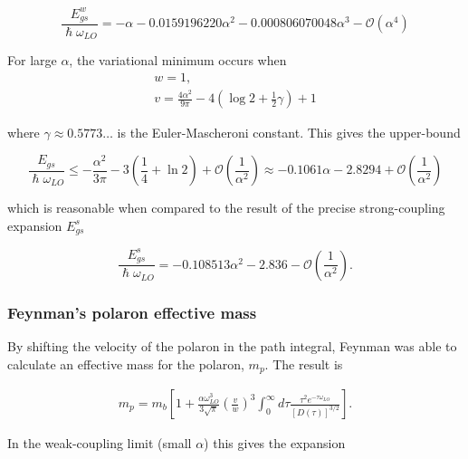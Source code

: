 \begin{equation}
    \frac{E^w_{gs}}{\hslash\omega_{LO}} = -\alpha - 0.0159196220 \alpha^2 - 0.000806070048 \alpha^3 - \mathcal{O}\left(\alpha^4\right) 
\end{equation}

For large $\alpha$, the variational minimum occurs when
\begin{equation}
\begin{gathered}
     w = 1, \\ 
     v = \frac{4\alpha^2}{9\pi} - 4\left( \log2 + \frac{1}{2} \gamma \right) + 1
\end{gathered}
\end{equation}

where $\gamma \approx 0.5773\dots$ is the Euler-Mascheroni constant. This gives the upper-bound

\begin{equation}
    \frac{E_{gs}}{\hslash\omega_{LO}} \leq -\frac{\alpha^2}{3\pi} - 3 \left(\frac{1}{4} + \ln 2\right) + \mathcal{O}\left(\frac{1}{\alpha^2}\right) \approx -0.1061\alpha - 2.8294 + \mathcal{O}\left(\frac{1}{\alpha^2}\right)
\end{equation}

which is reasonable when compared to the result of the precise strong-coupling expansion $E^s_{gs}$

\begin{equation}
    \frac{E^s_{gs}}{\hslash\omega_{LO}} = -0.108513 \alpha^2 - 2.836 - \mathcal{O}\left(\frac{1}{\alpha^2}\right).
\end{equation}

\subsubsection{Feynman's polaron effective mass}

By shifting the velocity of the polaron in the path integral, Feynman was able to calculate an effective mass for the polaron, $m_p$. The result is

\begin{equation}
\begin{gathered}
    \label{eqn:mass_feynman}
    m_p = m_b \left[ 1 + \frac{\alpha \omega^3_{LO}}{3\sqrt{\pi}} \left(\frac{v}{w}\right)^3 \int^\infty_0 d\tau \frac{\tau^2 e^{-\tau \omega_{LO}}}{[D(\tau)]^{3/2}} \right].
\end{gathered}
\end{equation}

In the weak-coupling limit (small $\alpha$) this gives the expansion


